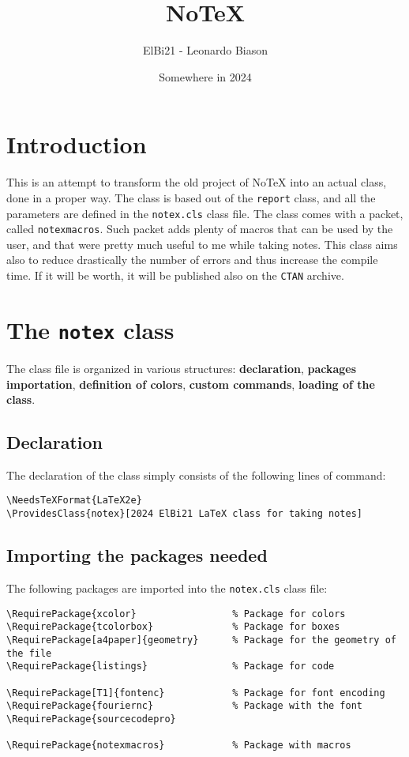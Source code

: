 \documentclass[]{notex}
\title{NoTeX}
\author{ElBi21 - Leonardo Biason}
\date{Somewhere in 2024}
\begin{document}
\maketitle

\chapter{Introduction}

\noindent This is an attempt to transform the old project of NoTeX into an actual class, done in a proper way. The class is based out of the \texttt{report} class, and all the parameters are defined in the \texttt{notex.cls} class file. The class comes with a packet, called \texttt{notexmacros}. Such packet adds plenty of macros that can be used by the user, and that were pretty much useful to me while taking notes. This class aims also to reduce drastically the number of errors and thus increase the compile time. If it will be worth, it will be published also on the \texttt{CTAN} archive.

\chapter{The \texttt{notex} class}

The class file is organized in various structures: \textbf{declaration}, \textbf{packages importation}, \textbf{definition of colors}, \textbf{custom commands}, \textbf{loading of the class}.

\section{Declaration}

The declaration of the class simply consists of the following lines of command:
\begin{tcolorbox}
    \begin{verbatim}
\NeedsTeXFormat{LaTeX2e}
\ProvidesClass{notex}[2024 ElBi21 LaTeX class for taking notes]\end{verbatim}
\end{tcolorbox}

\section{Importing the packages needed}

The following packages are imported into the \texttt{notex.cls} class file:
\begin{tcolorbox}
    \begin{verbatim}
\RequirePackage{xcolor}                 % Package for colors
\RequirePackage{tcolorbox}              % Package for boxes
\RequirePackage[a4paper]{geometry}      % Package for the geometry of the file
\RequirePackage{listings}               % Package for code

\RequirePackage[T1]{fontenc}            % Package for font encoding
\RequirePackage{fouriernc}              % Package with the font
\RequirePackage{sourcecodepro}

\RequirePackage{notexmacros}            % Package with macros
    \end{verbatim}
\end{tcolorbox}
\end{document}

